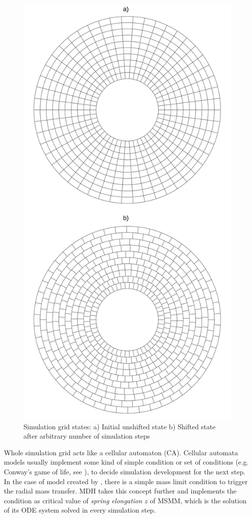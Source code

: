 \begin{figure}
\centering
\includegraphics[width=0.75\columnwidth]{img/grid_states.png}
\caption{Simulation grid states: a) Initial unshifted state b) Shifted state after arbitrary number of simulation steps}
\label{fig:grid_states}
\end{figure}

Whole simulation grid acts like a cellular automaton (CA). Cellular automata models usually implement some kind of simple condition or set of conditions (e.g. Conway's game of life, see \cite{gardner1970}), to decide simulation development for the next step. In the case of model created by \cite{yonehara1997}, there is a simple mass limit condition to trigger the radial mass transfer. MDH takes this concept further and implements the condition as critical value of \emph{spring elongation} $z$ of MSMM, which is the solution of its ODE system solved in every simulation step. 

